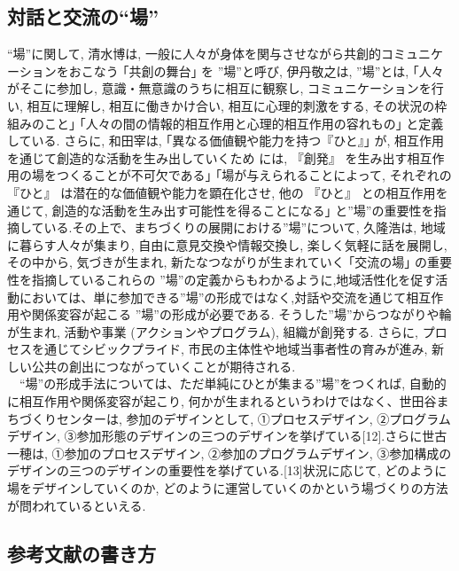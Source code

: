 \documentclass[a4paper]{jsarticle}
\begin{document}
\subsection{対話と交流の“場”}
“場”に関して, 清水博は, 一般に人々が身体を関与させながら共創的コミュニケーションをおこなう ｢共創の舞台｣ を ”場”と呼び\cite{9}, 伊丹敬之は, ”場”とは, ｢人々がそこに参加し, 意識・無意識のうちに相互に観察し, コミュニケーションを行い, 相互に理解し, 相互に働きかけ合い, 相互に心理的刺激をする, その状況の枠組みのこと｣ ｢人々の間の情報的相互作用と心理的相互作用の容れもの｣ と定義している\cite{10}. さらに, 和田宰は, ｢異なる価値観や能力を持つ『ひと』｣ が, 相互作用を通じて創造的な活動を生み出していくため には, 『創発』 を生み出す相互作用の場をつくることが不可欠である｣ ｢場が与えられることによって, それぞれの 『ひと』 は潜在的な価値観や能力を顕在化させ, 他の 『ひと』 との相互作用を通じて, 創造的な活動を生み出す可能性を得ることになる｣ と”場”の重要性を指摘している\cite{11}.その上で、まちづくりの展開における”場”について, 久隆浩は, 地域に暮らす人々が集まり, 自由に意見交換や情報交換し, 楽しく気軽に話を展開し, その中から, 気づきが生まれ, 新たなつながりが生まれていく ｢交流の場｣ の重要性を指摘している\cite{12}これらの ”場”の定義からもわかるように,地域活性化を促す活動においては、単に参加できる”場”の形成ではなく,対話や交流を通じて相互作用や関係変容が起こる ”場”の形成が必要である. そうした”場”からつながりや輪が生まれ, 活動や事業 (アクションやプログラム), 組織が創発する. さらに, プロセスを通じてシビックプライド, 市民の主体性や地域当事者性の育みが進み, 新しい公共の創出につながっていくことが期待される.\\　“場”の形成手法については、ただ単純にひとが集まる”場”をつくれば, 自動的に相互作用や関係変容が起こり, 何かが生まれるというわけではなく、世田谷まちづくりセンターは, 参加のデザインとして, ①プロセスデザイン, ②プログラムデザイン, ③参加形態のデザインの三つのデザインを挙げている[12].さらに世古一穂は, ①参加のプロセスデザイン, ②参加のプログラムデザイン, ③参加構成のデザインの三つのデザインの重要性を挙げている.[13]状況に応じて, どのように場をデザインしていくのか, どのように運営していくのかという場づくりの方法が問われているといえる.




\subsection{参考文献の書き方}
\end{document}
